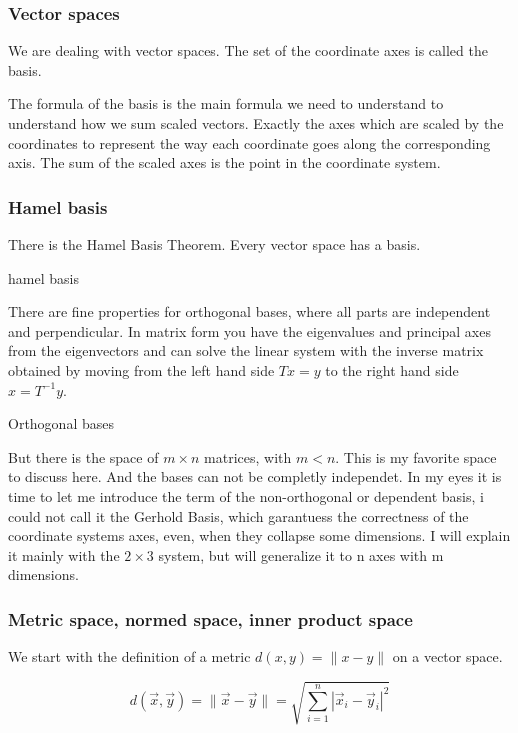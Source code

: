 \documentclass[a4paper]{article}
\begin{document}
\subsubsection{Vector spaces}


We are dealing with vector spaces. The set of the coordinate axes is called the basis. 


The formula of the basis is the main formula we need to understand to understand how we sum scaled vectors. Exactly the axes which are scaled by the coordinates to represent the way each coordinate goes along the corresponding axis. The sum of the scaled axes is the point in the coordinate system. 

\subsubsection{Hamel basis}

There is the Hamel Basis Theorem. Every vector space has a basis.

hamel basis


There are fine properties for orthogonal bases, where all parts are independent and perpendicular.
In matrix form you have the eigenvalues and principal axes from the eigenvectors and can solve the linear system with the inverse matrix obtained by moving from the left hand side $Tx = y$ to the right hand side $x = T^{-1}y$. 


Orthogonal bases


But there is the space of $m \times n$ matrices, with $m \lt n$. This is my favorite space to discuss here. And the bases can not be completly independet. In my eyes it is time to let me introduce the term of the non-orthogonal or dependent basis, i could not call it the Gerhold Basis, which garantuess the correctness of the coordinate systems axes, even, when they collapse some dimensions. I will explain it mainly with the $2 \times 3$ system, but will generalize it to n axes with m dimensions.



\subsubsection{Metric space, normed space, inner product space}


We start with the definition of a metric $d(x,y) = \|x-y\|$ on a vector space. 



\begin{displaymath}
    d(\vec{x}, \vec{y}) = \|\vec{x}-\vec{y}\| = \sqrt{\sum_{i=1}^{n}|\vec{x}_{i}-\vec{y}_{i}|^2}
\end{displaymath}
\end{document}
